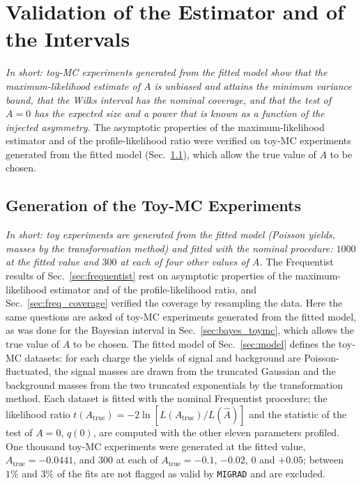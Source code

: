 \section{Validation of the Estimator and of the Intervals}
\label{sec:validation}
\label{app:ext_valid}
\emph{In short: toy-MC experiments generated from the fitted model show that the maximum-likelihood estimate of $A$ is unbiased and attains the minimum variance bound, that the Wilks interval has the nominal coverage, and that the test of $A=0$ has the expected size and a power that is known as a function of the injected asymmetry.}
The asymptotic properties of the maximum-likelihood estimator and of the profile-likelihood ratio were verified on toy-MC experiments generated from the fitted model (Sec.~\ref{sec:validation_toys}), which allow the true value of $A$ to be chosen.
\subsection{Generation of the Toy-MC Experiments}
\label{sec:validation_toys}
\emph{In short: toy experiments are generated from the fitted model (Poisson yields, masses by the transformation method) and fitted with the nominal procedure: $1000$ at the fitted value and $300$ at each of four other values of $A$.}
The Frequentist results of Sec.~\ref{sec:frequentist} rest on asymptotic properties of the maximum-likelihood estimator and of the profile-likelihood ratio, and Sec.~\ref{sec:freq_coverage} verified the coverage by resampling the data. Here the same questions are asked of toy-MC experiments generated from the fitted model, as was done for the Bayesian interval in Sec.~\ref{sec:bayes_toymc}, which allows the true value of $A$ to be chosen. The fitted model of Sec.~\ref{sec:model} defines the toy-MC datasets: for each charge the yields of signal and background are Poisson-fluctuated, the signal masses are drawn from the truncated Gaussian and the background masses from the two truncated exponentials by the transformation method. Each dataset is fitted with the nominal Frequentist procedure; the likelihood ratio $t(A_{\mathrm{true}})=-2\ln[L(A_{\mathrm{true}})/L(\hat A)]$ and the statistic of the test of $A=0$, $q(0)$, are computed with the other eleven parameters profiled. One thousand toy-MC experiments were generated at the fitted value, $A_{\mathrm{true}}=-0.0441$, and $300$ at each of $A_{\mathrm{true}}=-0.1$, $-0.02$, $0$ and $+0.05$; between $1\%$ and $3\%$ of the fits are not flagged as valid by \texttt{MIGRAD} and are excluded.
